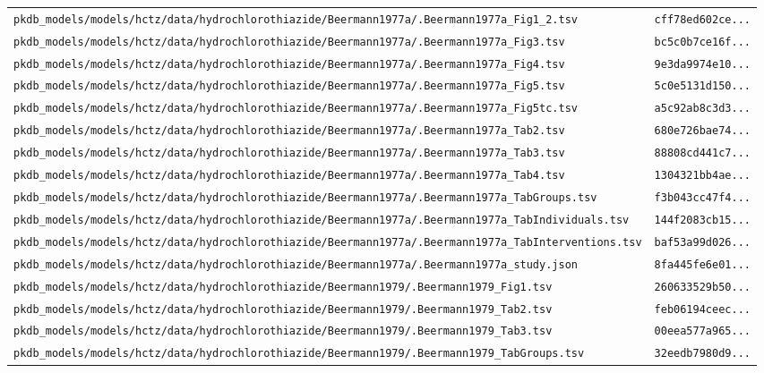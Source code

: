 \documentclass{article}
\begin{document}
\begin{longtable}{ll}
\texttt{pkdb\_models/models/hctz/data/hydrochlorothiazide/Beermann1977a/.Beermann1977a\_Fig1\_2.tsv} & \texttt{cff78ed602ce...} \\
\texttt{pkdb\_models/models/hctz/data/hydrochlorothiazide/Beermann1977a/.Beermann1977a\_Fig3.tsv} & \texttt{bc5c0b7ce16f...} \\
\texttt{pkdb\_models/models/hctz/data/hydrochlorothiazide/Beermann1977a/.Beermann1977a\_Fig4.tsv} & \texttt{9e3da9974e10...} \\
\texttt{pkdb\_models/models/hctz/data/hydrochlorothiazide/Beermann1977a/.Beermann1977a\_Fig5.tsv} & \texttt{5c0e5131d150...} \\
\texttt{pkdb\_models/models/hctz/data/hydrochlorothiazide/Beermann1977a/.Beermann1977a\_Fig5tc.tsv} & \texttt{a5c92ab8c3d3...} \\
\texttt{pkdb\_models/models/hctz/data/hydrochlorothiazide/Beermann1977a/.Beermann1977a\_Tab2.tsv} & \texttt{680e726bae74...} \\
\texttt{pkdb\_models/models/hctz/data/hydrochlorothiazide/Beermann1977a/.Beermann1977a\_Tab3.tsv} & \texttt{88808cd441c7...} \\
\texttt{pkdb\_models/models/hctz/data/hydrochlorothiazide/Beermann1977a/.Beermann1977a\_Tab4.tsv} & \texttt{1304321bb4ae...} \\
\texttt{pkdb\_models/models/hctz/data/hydrochlorothiazide/Beermann1977a/.Beermann1977a\_TabGroups.tsv} & \texttt{f3b043cc47f4...} \\
\texttt{pkdb\_models/models/hctz/data/hydrochlorothiazide/Beermann1977a/.Beermann1977a\_TabIndividuals.tsv} & \texttt{144f2083cb15...} \\
\texttt{pkdb\_models/models/hctz/data/hydrochlorothiazide/Beermann1977a/.Beermann1977a\_TabInterventions.tsv} & \texttt{baf53a99d026...} \\
\texttt{pkdb\_models/models/hctz/data/hydrochlorothiazide/Beermann1977a/.Beermann1977a\_study.json} & \texttt{8fa445fe6e01...} \\
\texttt{pkdb\_models/models/hctz/data/hydrochlorothiazide/Beermann1979/.Beermann1979\_Fig1.tsv} & \texttt{260633529b50...} \\
\texttt{pkdb\_models/models/hctz/data/hydrochlorothiazide/Beermann1979/.Beermann1979\_Tab2.tsv} & \texttt{feb06194ceec...} \\
\texttt{pkdb\_models/models/hctz/data/hydrochlorothiazide/Beermann1979/.Beermann1979\_Tab3.tsv} & \texttt{00eea577a965...} \\
\texttt{pkdb\_models/models/hctz/data/hydrochlorothiazide/Beermann1979/.Beermann1979\_TabGroups.tsv} & \texttt{32eedb7980d9...} \\

\end{longtable}
\end{document}
